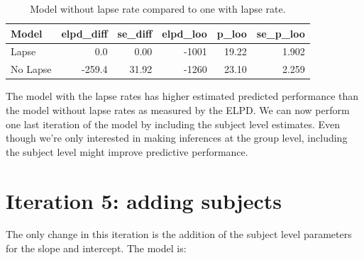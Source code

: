 \documentclass[11pt, oneside, openany]{scrbook}
\begin{document}
\begin{table}[!h]

\caption{\label{tab:ch044-Straw-Epsilon}Model without lapse rate compared to one with lapse rate.}
\centering
\begin{tabular}[t]{lrrrrr}
\toprule
Model & elpd\_diff & se\_diff & elpd\_loo & p\_loo & se\_p\_loo\\
\midrule
Lapse & 0.0 & 0.00 & -1001 & 19.22 & 1.902\\
No Lapse & -259.4 & 31.92 & -1260 & 23.10 & 2.259\\
\bottomrule
\end{tabular}
\end{table}

The model with the lapse rates has higher estimated predicted performance than the model without lapse rates as measured by the ELPD. We can now perform one last iteration of the model by including the subject level estimates. Even though we're only interested in making inferences at the group level, including the subject level might improve predictive performance.

\hypertarget{iter5}{%
\section{Iteration 5: adding subjects}\label{iter5}}

The only change in this iteration is the addition of the subject level parameters for the slope and intercept. The model is:

\end{document}
